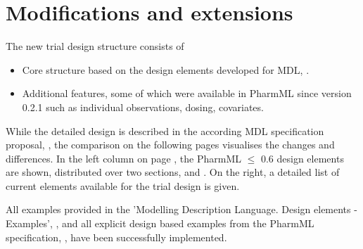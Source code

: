 \section{Modifications and extensions}
The new trial design structure consists of
\begin{itemize}
\item
Core structure based on the design elements developed for MDL, \cite{Commets2015, CommetsExamples2015}.
\item
Additional features, some of which were available in PharmML since version 0.2.1 such as individual 
observations, dosing, covariates.
\end{itemize}
While the detailed design is described in the according MDL specification proposal, 
\cite{Commets2015}, the comparison on the following pages visualises the changes
and differences. In the left column on page \pageref{miniPage:comparison}, the PharmML 
$\leq$ 0.6 design elements are shown, distributed
over two sections,  and . 
On the right, a detailed list of current elements available for the trial design is given.

All examples provided in the 'Modelling Description Language. Design 
elements - Examples', \cite{CommetsExamples2015}, and all explicit design 
based examples from the PharmML specification, \cite{Pharmml_06}, have 
been successfully implemented.

